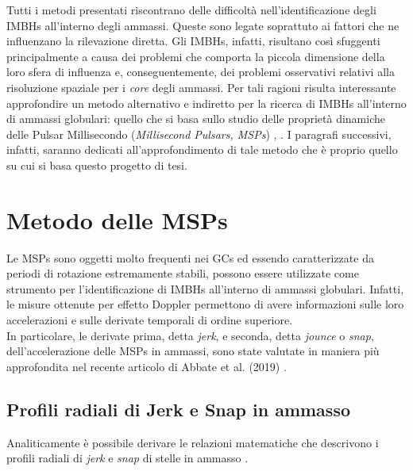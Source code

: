 Tutti i metodi presentati riscontrano delle difficoltà nell'identificazione degli IMBHs all'interno degli ammassi. Queste sono legate soprattuto ai fattori che ne influenzano la rilevazione diretta. Gli IMBHs, infatti, risultano così sfuggenti principalmente a causa dei problemi che comporta la piccola dimensione della loro sfera di influenza e, conseguentemente, dei problemi osservativi relativi alla risoluzione spaziale per i \textit{core} degli ammassi.
Per tali ragioni risulta interessante approfondire un metodo alternativo e indiretto per la ricerca di IMBHs all'interno di ammassi globulari: quello che si basa sullo studio delle proprietà dinamiche delle Pulsar Millisecondo (\textit{Millisecond Pulsars, MSPs}) \cite{pere:paper}, \cite{abbate:paper}.  
I paragrafi successivi, infatti, saranno dedicati all'approfondimento di tale metodo che è proprio quello su cui si basa questo progetto di tesi.

\section{Metodo delle MSPs}
\label{sec:MSP}

Le MSPs sono oggetti molto frequenti nei GCs ed essendo caratterizzate da periodi di rotazione estremamente stabili, possono essere utilizzate come strumento per l'identificazione di IMBHs all'interno di ammassi globulari. Infatti, le misure ottenute per effetto Doppler permettono di avere informazioni sulle loro accelerazioni e sulle derivate temporali di ordine superiore.\\
In particolare, le derivate prima, detta \textit{jerk}, e seconda, detta \textit{jounce} o \textit{snap}, dell'accelerazione delle MSPs in ammassi, sono state valutate in maniera più approfondita nel recente articolo di Abbate et al. (2019) \cite{abbate1:paper}.\\
\subsection{Profili radiali di Jerk e Snap in ammasso}
\label{subsec:profili}

Analiticamente è possibile derivare le relazioni matematiche che descrivono i profili radiali di \textit{jerk} e \textit{snap} di stelle in ammasso \cite{abbate1:paper}.

